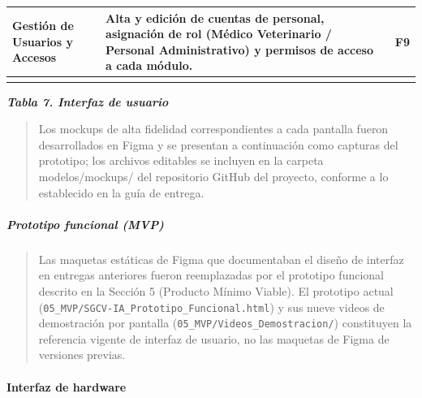 \documentclass[
]{article}
\newcounter{none} %
\begin{document}
{\def\LTcaptype{none} %
\begin{longtable}[]{|
  >{\raggedright\arraybackslash}p{}|
  >{\raggedright\arraybackslash}p{}|
  >{\raggedright\arraybackslash}p{}|}
\hline
\begin{minipage}[b]{\linewidth}\raggedright
\textbf{Gestión de Usuarios y Accesos}
\end{minipage} & \begin{minipage}[b]{\linewidth}\raggedright
Alta y edición de cuentas de personal, asignación de rol (Médico Veterinario / Personal Administrativo) y permisos de acceso a
cada módulo.
\end{minipage} & \begin{minipage}[b]{\linewidth}\raggedright
F9
\end{minipage} \\
\hline
\endhead
\hline
\endlastfoot
\end{longtable}
}

\protect{}\label{_bookmark24}{}\emph{\textbf{Tabla 7.
Interfaz de usuario}}

\begin{quote}
Los mockups de alta fidelidad correspondientes a cada pantalla fueron
desarrollados en Figma y se presentan a continuación como capturas del
prototipo; los archivos editables se incluyen en la carpeta
modelos/mockups/ del repositorio GitHub del proyecto, conforme a lo
establecido en la guía de entrega.
\end{quote}

\subparagraph{Prototipo funcional (MVP)}\label{mockups-de-interfaz-capturas-del-prototipo}

\begin{quote}
Las maquetas estáticas de Figma que documentaban el diseño de interfaz
en entregas anteriores fueron reemplazadas por el prototipo funcional
descrito en la Sección 5 (Producto Mínimo Viable). El prototipo actual
(\texttt{05\_MVP/SGCV-IA\_Prototipo\_Funcional.html}) y sus nueve
videos de demostración por pantalla
(\texttt{05\_MVP/Videos\_Demostracion/}) constituyen la referencia
vigente de interfaz de usuario, no las maquetas de Figma de versiones
previas.
\end{quote}

\paragraph{Interfaz de hardware}\label{interfaz-de-hardware}
\end{document}

